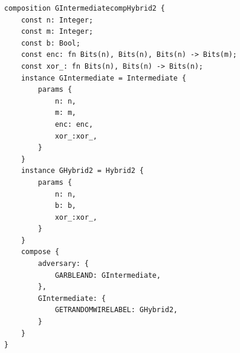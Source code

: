 \begin{longlisting}
\begin{verbatim}
composition GIntermediatecompHybrid2 {
    const n: Integer; 
    const m: Integer; 
    const b: Bool;
    const enc: fn Bits(n), Bits(n), Bits(n) -> Bits(m); 
    const xor_: fn Bits(n), Bits(n) -> Bits(n);
    instance GIntermediate = Intermediate {
        params {
            n: n,
            m: m,
            enc: enc,
            xor_:xor_,
        }
    }
    instance GHybrid2 = Hybrid2 {
        params {
            n: n,
            b: b,
            xor_:xor_,
        }
    }
    compose {
        adversary: {
            GARBLEAND: GIntermediate,
        },
        GIntermediate: {
            GETRANDOMWIRELABEL: GHybrid2,
        }
    }
}
\end{verbatim}
\caption{Composition }
\label{lst:domino-composition-gintermediatecomphybrid2}
\end{longlisting}